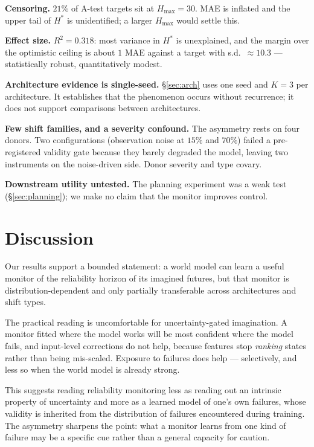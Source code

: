 \documentclass[twocolumn,10pt]{article}
\newcommand{\Hstar}{H^{*}}
\begin{document}
\textbf{Censoring.} $21\%$ of A-test targets sit at $H_{\max} = 30$. MAE is inflated and the
upper tail of $\Hstar$ is unidentified; a larger $H_{\max}$ would settle this.

\textbf{Effect size.} $R^2 = 0.318$: most variance in $\Hstar$ is unexplained, and the margin
over the optimistic ceiling is about $1$ MAE against a target with s.d.\ $\approx 10.3$ ---
statistically robust, quantitatively modest.

\textbf{Architecture evidence is single-seed.} \S\ref{sec:arch} uses one seed and $K=3$ per
architecture. It establishes that the phenomenon occurs without recurrence; it does not support
comparisons between architectures.

\textbf{Few shift families, and a severity confound.} The asymmetry rests on four donors. Two
configurations (observation noise at $15\%$ and $70\%$) failed a pre-registered validity gate
because they barely degraded the model, leaving two instruments on the noise-driven side. Donor
severity and type covary.

\textbf{Downstream utility untested.} The planning experiment was a weak test
(\S\ref{sec:planning}); we make no claim that the monitor improves control.

\section{Discussion}
\label{sec:discussion}

Our results support a bounded statement: a world model can learn a useful monitor of the
reliability horizon of its imagined futures, but that monitor is distribution-dependent and
only partially transferable across architectures and shift types.

The practical reading is uncomfortable for uncertainty-gated imagination. A monitor fitted where
the model works will be most confident where the model fails, and input-level corrections do not
help, because features stop \emph{ranking} states rather than being mis-scaled. Exposure to
failures does help --- selectively, and less so when the world model is already strong.

This suggests reading reliability monitoring less as reading out an intrinsic property of
uncertainty and more as a learned model of one's own failures, whose validity is inherited from
the distribution of failures encountered during training. The asymmetry sharpens the point: what
a monitor learns from one kind of failure may be a specific cue rather than a general capacity
for caution.
\end{document}
